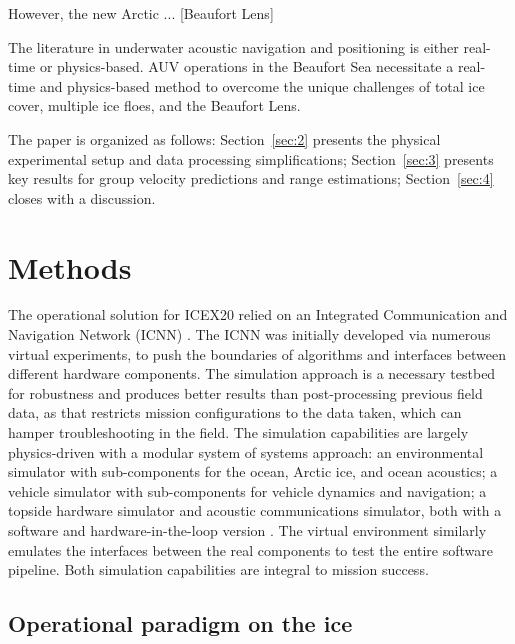 However, the new Arctic ... [Beaufort Lens]

The literature in underwater acoustic navigation and positioning is either real-time or physics-based.
AUV operations in the Beaufort Sea necessitate a real-time and physics-based method to overcome the unique challenges of total ice cover, multiple ice floes, and the Beaufort Lens.

The paper is organized as follows: Section~\ref{sec:2} presents the physical
experimental setup and data processing simplifications; Section~\ref{sec:3} presents key results for group velocity predictions and range estimations; Section~\ref{sec:4} closes with a discussion.




\section{\label{sec:2} Methods}

The operational solution for ICEX20 relied on an Integrated Communication and Navigation Network (ICNN) \citep{schneider_self-adapting_2020,randeni_construction_2020,randeni_high-resolution_2021}.
The ICNN was initially developed via numerous virtual experiments, to push the boundaries of algorithms and interfaces between different hardware components.
The simulation approach is a necessary testbed for robustness and produces better results than post-processing previous field data, as that restricts mission configurations to the data taken, which can hamper troubleshooting in the field.
The simulation capabilities are largely physics-driven with a modular system of systems approach: an environmental simulator with sub-components for the ocean, Arctic ice, and ocean acoustics; a vehicle simulator with sub-components for vehicle dynamics and navigation; a topside hardware simulator and acoustic communications simulator, both with a software and hardware-in-the-loop version \citep{schneider_netsim_2018}.
The virtual environment similarly emulates the interfaces between the real components to test the entire software pipeline.
Both simulation capabilities are integral to mission success.

\subsection{Operational paradigm on the ice}

